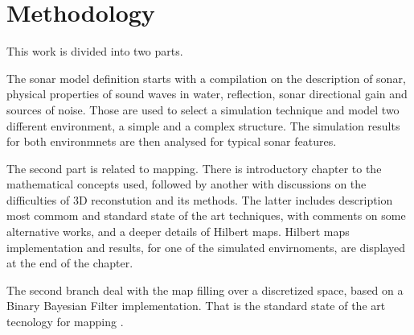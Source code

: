 

\section{Methodology}
 


% 


This work is divided into two parts.

The sonar model definition starts with a compilation on the description of
sonar, physical properties of sound waves in water, reflection, sonar
directional gain and sources of noise. Those are used to select a simulation
technique and model two different environment, a simple and a complex
structure. The simulation results for both environmnets are then analysed for
typical sonar features.

The second part is related to mapping. There is introductory chapter to the
mathematical concepts used, followed by another with discussions on the
difficulties of 3D reconstution and its methods. The latter includes description
most commom and standard state of the art techniques, with comments on some
alternative works, and a deeper details of Hilbert maps. Hilbert maps
implementation and results, for one of the simulated envirnoments, are displayed
at the end of the chapter.

The second branch deal with the map filling over a discretized space, based on
a Binary Bayesian Filter implementation. That is the standard state of the art
tecnology for mapping \cite{thrunprob}.


